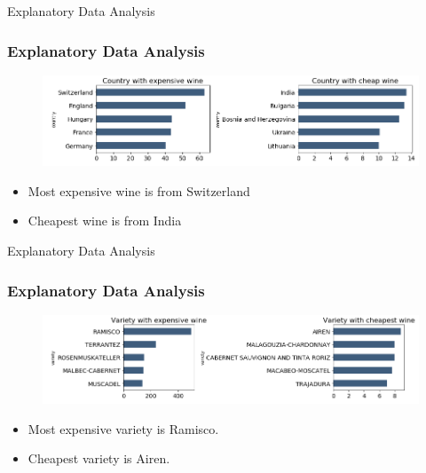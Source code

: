 \documentclass[11pt]{beamer}
\begin{document}
	\begin{frame}{Explanatory Data Analysis}
	\frametitle{Explanatory Data Analysis}
	\begin{figure}
	\includegraphics[width=\linewidth]{CountrybyPrice}

	\end{figure}
\begin{itemize}
	\item Most expensive wine is from Switzerland
	\item Cheapest wine is from India
\end{itemize}
	
	\end{frame}	

	
		\begin{frame}{Explanatory Data Analysis}
	\frametitle{Explanatory Data Analysis}
	\begin{figure}
		\includegraphics[width=\linewidth]{VarietybyPrice}
		
	\end{figure}
	\begin{itemize}
		\item Most expensive variety is Ramisco.
		\item Cheapest variety is Airen.
	\end{itemize}
	
\end{frame}	
\end{document}
